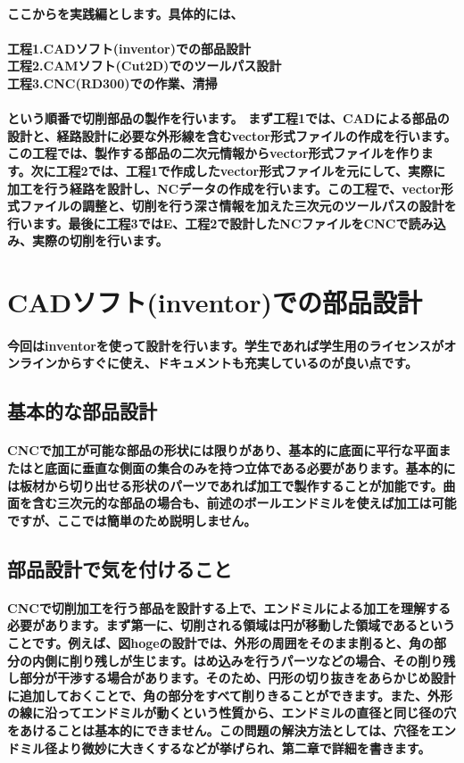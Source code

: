 \documentclass[b5paper, 9pt, twocolumn, titlepage,openany]{jsbook}%
\begin{document}
\paragraph{ここからを実践編とします。具体的には、\\\\
工程1.CADソフト(inventor)での部品設計\\
工程2.CAMソフト(Cut2D)でのツールパス設計\\
工程3.CNC(RD300)での作業、清掃\\\\
という順番で切削部品の製作を行います。
まず工程1では、CADによる部品の設計と、経路設計に必要な外形線を含むvector形式ファイルの作成を行います。この工程では、製作する部品の二次元情報からvector形式ファイルを作ります。次に工程2では、工程1で作成したvector形式ファイルを元にして、実際に加工を行う経路を設計し、NCデータの作成を行います。この工程で、vector形式ファイルの調整と、切削を行う深さ情報を加えた三次元のツールパスの設計を行います。最後に工程3ではE、工程2で設計したNCファイルをCNCで読み込み、実際の切削を行います。}

\section{CADソフト(inventor)での部品設計}
\paragraph{今回はinventorを使って設計を行います。学生であれば学生用のライセンスがオンラインからすぐに使え、ドキュメントも充実しているのが良い点です。}
\subsection{基本的な部品設計}
\paragraph{CNCで加工が可能な部品の形状には限りがあり、基本的に底面に平行な平面またはと底面に垂直な側面の集合のみを持つ立体である必要があります。基本的には板材から切り出せる形状のパーツであれば加工で製作することが加能です。曲面を含む三次元的な部品の場合も、前述のボールエンドミルを使えば加工は可能ですが、ここでは簡単のため説明しません。}
\subsection{部品設計で気を付けること}
\paragraph{CNCで切削加工を行う部品を設計する上で、エンドミルによる加工を理解する必要があります。まず第一に、切削される領域は円が移動した領域であるということです。例えば、図hogeの設計では、外形の周囲をそのまま削ると、角の部分の内側に削り残しが生じます。はめ込みを行うパーツなどの場合、その削り残し部分が干渉する場合があります。そのため、円形の切り抜きをあらかじめ設計に追加しておくことで、角の部分をすべて削りきることができます。また、外形の線に沿ってエンドミルが動くという性質から、エンドミルの直径と同じ径の穴をあけることは基本的にできません。この問題の解決方法としては、穴径をエンドミル径より微妙に大きくするなどが挙げられ、第二章で詳細を書きます。}
\end{document}
